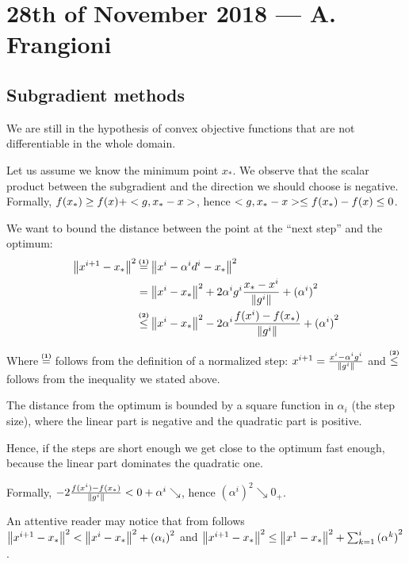 \documentclass[ComputationalMathematics.tex]{subfiles}
\begin{document}
\section{28th of November 2018 --- A. Frangioni}

\subsection{Subgradient methods}
We are still in the hypothesis of convex objective functions that are not differentiable in the whole domain.


Let us assume we know the minimum point $x_*$. We observe that the scalar product between the subgradient and the direction we should choose is negative.
Formally, $f(x_*) \ge f(x) + <g, x_* - x>$, hence $<g, x_*-x> \le f(x_*) - f(x) \le 0$.

We want to bound the distance between the point at the ``next step'' and the optimum:
\begin{equation}
  \begin{aligned}
    \sqrnorm{x^{i+1} - x_*} &\numeq{(1)} \sqrnorm{x^i - \alpha^i d^i - x_*}\\
    &= \sqrnorm{x^i  - x_*} + 2\alpha^i g^i \frac{x_* - x^i}{\norm{g^i}} + {(\alpha^i)}^2\\
    &\numineq{(2)}{\le} \sqrnorm{x^i  - x_*} - 2 \alpha^i \frac{f(x^i) - f(x_*)}{\norm{g^i}} + {(\alpha^i)}^2
  \end{aligned}\label{eq:28nov1}
\end{equation}

Where $\numeq{(1)}$ follows from the definition of a normalized step: $x^{i+1} = \frac{x^i - \alpha^i g^i}{\left\lVert g^i\right\rVert}$ and $\numineq{(2)}{\le}$ follows from the inequality we stated above.

\begin{obs}
  The distance from the optimum is bounded by a square function in $\alpha_i$ (the step size), where the linear part is negative and the quadratic part is positive.
  
  Hence, if the steps are short enough we get close to the optimum fast enough, because the linear part dominates the quadratic one.
  
  Formally, $- 2 \frac{f(x^i) - f(x_*)}{\left\lVert g^i\right\rVert} < 0 + \alpha ^i \searrow$, hence ${(\alpha^i)}^2 \searrow 0_+$.

  An attentive reader may notice that from  follows ${\left\lVert x^{i+1}  - x_*\right\rVert}^2 < {\left\lVert x^i  - x_*\right\rVert}^2 + {(\alpha_i)}^2$ and ${\left\lVert x^{i+1} - x_*\right\rVert}^2 \leq {\left\lVert x^1  - x_*\right\rVert}^2 + \sum_{k = 1}^i {(\alpha^k)}^2$.
\end{obs}
\end{document}

